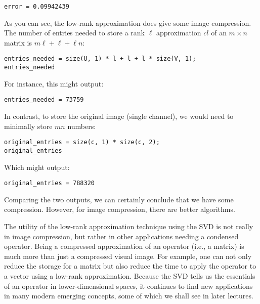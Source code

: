 \documentclass{ximera}
\begin{document}
\begin{verbatim}
error = 0.09942439
\end{verbatim}

As you can see, the low-rank approximation does give some image compression. The number of entries needed to store a rank \( \ell \) approximation \( cl \) of an \( m \times n \) matrix is \( m\ell + \ell + \ell n \):

\begin{verbatim}
entries_needed = size(U, 1) * l + l + l * size(V, 1);
entries_needed
\end{verbatim}

For instance, this might output:

\begin{verbatim}
entries_needed = 73759
\end{verbatim}

In contrast, to store the original image (single channel), we would need to minimally store \( mn \) numbers:

\begin{verbatim}
original_entries = size(c, 1) * size(c, 2);
original_entries
\end{verbatim}

Which might output:

\begin{verbatim}
original_entries = 788320
\end{verbatim}

Comparing the two outputs, we can certainly conclude that we have some compression. However, for image compression, there are better algorithms.

The utility of the low-rank approximation technique using the SVD is not really in image compression, but rather in other applications needing a condensed operator. Being a compressed approximation of an operator (i.e., a matrix) is much more than just a compressed visual image. For example, one can not only reduce the storage for a matrix but also reduce the time to apply the operator to a vector using a low-rank approximation. Because the SVD tells us the essentials of an operator in lower-dimensional spaces, it continues to find new applications in many modern emerging concepts, some of which we shall see in later lectures.
 
\end{document}
